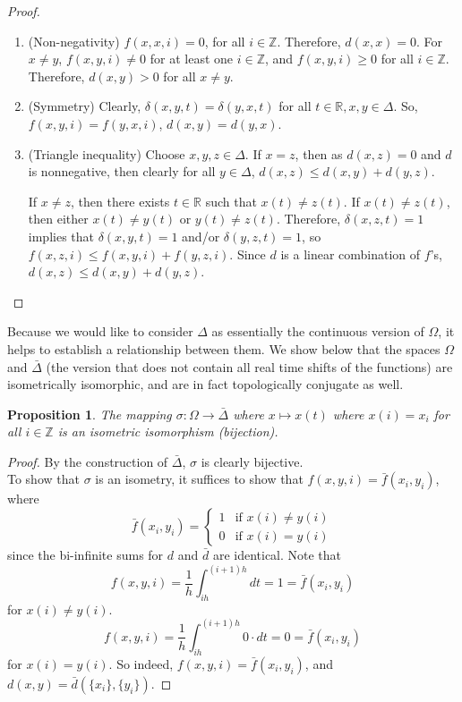 \documentclass[11pt]{article}
\newtheorem{prop}[thm]{Proposition}
\begin{document}
\begin{proof}
\ \\
\begin{enumerate}

\item (Non-negativity) $f(x, x, i) = 0$, for all $i \in \mathbb{Z}$.  Therefore, $d(x,x) = 0$.  For $x \neq y$, $f(x,y,i) \neq 0$ for at least one $i \in \mathbb{Z}$, and $f(x, y, i) \geq 0$ for all $i \in \mathbb{Z}$.  Therefore, $d(x,y) > 0$ for all $x \neq y$.
\item (Symmetry) Clearly, $\delta(x,y,t) = \delta(y,x,t)$ for all $t \in \mathbb{R}, x, y \in \Delta$.  So, $f(x,y,i) = f(y,x,i)$, $d(x,y) = d(y,x)$.
\item (Triangle inequality) Choose $x,y,z\in\Delta$.  If $x=z$, then as $d(x,z)=0$ and $d$ is nonnegative, then clearly for all $y\in\Delta$, $d(x,z)\leq d(x,y)+d(y,z)$.   

If $x\not =z$, then there exists $t\in\mathbb{R}$ such that $x(t)\not = z(t)$.  If $x(t) \neq z(t)$, then either $x(t) \neq y(t)$ or $y(t) \neq z(t)$.  Therefore, $\delta(x,z,t) = 1$ implies that $\delta(x,y,t) = 1$ and/or $\delta(y,z,t) = 1$, so $f(x,z,i) \leq f(x,y,i) + f(y,z,i)$.  Since $d$ is a linear combination of $f$'s, $d(x,z) \leq d(x,y) + d(y,z)$.
\end{enumerate}
\end{proof}
Because we would like to consider $\Delta$ as essentially the continuous version of $\Omega$, it helps to establish a relationship between them.  We show below that the spaces $\Omega$ and $\bar{\Delta}$ (the version that does not contain all real time shifts of the functions) are isometrically isomorphic, and are in fact topologically conjugate as well. 


\begin{prop} \label{isoiso}
The mapping 
$\sigma: \Omega \rightarrow \bar\Delta$ where $x\mapsto x(t)$ where $x(i)=x_i$ for all $i\in\mathbb{Z}$ is an isometric isomorphism (bijection).
\end{prop}

\begin{proof}
By the construction of $\bar\Delta$, $\sigma$ is clearly bijective.\\
To show that $\sigma$ is an isometry, it suffices to show that $f(x,y,i) = \bar{f}(x_i,y_i)$, where
$$ \bar{f}(x_i,y_i) =   
\left\{ \begin{array}{cc}
1 & \mbox{if } x(i) \neq y(i)\\
0 & \mbox{if } x(i) = y(i)
\end{array} \right.$$
since the bi-infinite sums for $d$ and $\bar{d}$ are identical.  Note that
$$f(x,y,i) = \frac{1}{h}\int_{ih}^{(i+1)h}{dt} = 1 = \bar{f}(x_i, y_i)$$
for $x(i) \neq y(i)$.
$$ f(x,y,i) = \frac{1}{h}\int_{ih}^{(i+1)h}{0 \cdot dt} = 0 = \bar{f}(x_i, y_i)$$
for $x(i) = y(i)$.
So indeed, $f(x,y,i) = \bar{f}(x_i,y_i)$, and $d(x,y) = \bar{d}(\{x_i\},\{y_i\})$.

\end{proof}
\end{document}
